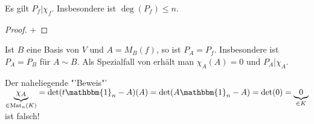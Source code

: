 \begin{conclusion}
	Es gilt $P_f\vert \chi_f$. Insbesondere ist $\deg(P_f)\le n$.
\end{conclusion}
\begin{proof}
	 + 
\end{proof}

\begin{remark}
	Ist $B$ eine Basis von $V$ und $A=M_B(f)$, so ist $P_A=P_f$. Insbesondere ist $P_A=P_B$ für $A\sim B$. Als Spezialfall von  erhält man $\chi_A(A)=0$ und $P_A\vert \chi_A$.
\end{remark}

\begin{remark}
	Der naheliegende "'Beweis"' $\underbrace{\chi_A}_{\in\Mat_n(K)}=\det(t\mathbbm{1}_n-A)(A) =\det(A\mathbbm{1}_n-A)=\det(0)=\underbrace{0}_{\in K}$ ist falsch!
\end{remark}
